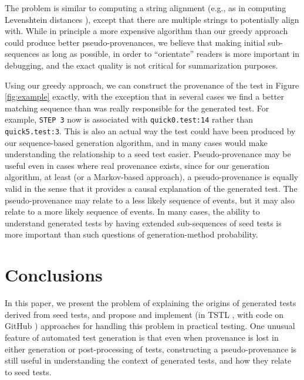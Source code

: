 \documentclass[final]{article}
\begin{document}
The problem is similar to computing a string alignment (e.g., as in
computing Levenshtein distances \cite{lev}), except that there are
multiple strings to potentially align with.  While in principle a more
expensive algorithm than our greedy approach could produce better
pseudo-provenances, we believe that making initial sub-sequences as
long as possible, in order to ``orientate'' readers is more
important in debugging, and the exact quality is not critical for summarization
purposes.

Using our greedy approach, we can construct the provenance of the test
in Figure \ref{fig:example} exactly, with the exception that in
several cases we find a better matching sequence than was really
responsible for the generated test.  For example, {\tt STEP 3} now is
associated with {\tt quick0.test:14} rather than {\tt quick5.test:3}.
This is also an actual way the test could have been produced by our
sequence-based generation
algorithm, and in many cases would make understanding the relationship
to a seed test easier.  Pseudo-provenance may be useful even in cases
where real provenance exists, since for our generation algorithm, at least (or a
Markov-based approach), a pseudo-provenance is equally valid in the
sense that it provides a causal explanation of the generated test.
The pseudo-provenance may relate to a less likely sequence of events,
but it may also relate to a more likely sequence of events.  In many
cases, the ability to understand generated tests by having extended
sub-sequences of seed tests is more important than such questions of
generation-method probability.

\section{Conclusions}

In this paper, we present the problem of explaining the origins of
generated tests derived from seed tests, and propose and implement (in
TSTL \cite{tstlsttt}, with code on GitHub \cite{tstl}) approaches for
handling this problem in practical testing.  One unusual feature of automated test
generation is that even when provenance is lost in either generation
or post-processing of tests, constructing a pseudo-provenance is still
useful in understanding the context of generated tests, and how they
relate to seed tests.





\end{document}
